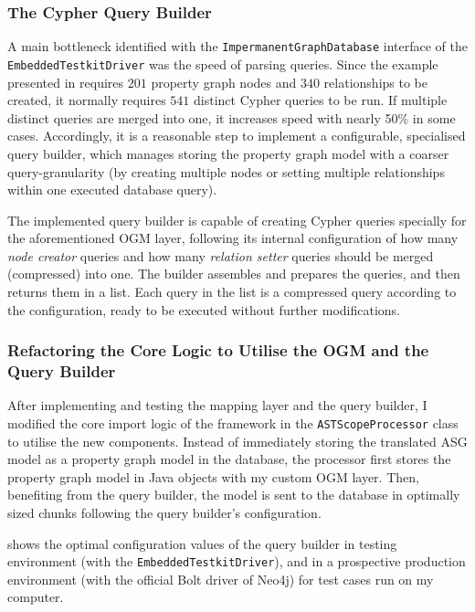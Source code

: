 \subsubsection{The Cypher Query Builder}

A main bottleneck identified with the \texttt{ImpermanentGraphDatabase} interface of the \texttt{EmbeddedTestkitDriver} was the speed of parsing queries. Since the example presented in  requires $201$ property graph nodes and $340$ relationships to be created, it normally requires $541$ distinct Cypher queries to be run. If multiple distinct queries are merged into one, it increases speed with nearly 50\% in some cases. Accordingly, it is a reasonable step to implement a configurable, specialised query builder, which manages storing the property graph model with a coarser query-granularity (by creating multiple nodes or setting multiple relationships within one executed database query).

The implemented query builder is capable of creating Cypher queries specially for the aforementioned OGM layer, following its internal configuration of how many \emph{node creator} queries and how many \emph{relation setter} queries should be merged (compressed) into one. The builder assembles and prepares the queries, and then returns them in a list. Each query in the list is a compressed query according to the configuration, ready to be executed without further modifications.


\subsubsection{Refactoring the Core Logic to Utilise the OGM and the Query Builder}

After implementing and testing the mapping layer and the query builder, I modified the core import logic of the framework in the \texttt{ASTScopeProcessor} class to utilise the new components. Instead of immediately storing the translated ASG model as a property graph model in the database, the processor first stores the property graph model in Java objects with my custom OGM layer. Then, benefiting from the query builder, the model is sent to the database in optimally sized chunks following the query builder's configuration.

 shows the optimal configuration values of the query builder in testing environment (with the \texttt{EmbeddedTestkitDriver}), and in a prospective production environment (with the official Bolt driver of Neo4j) for test cases run on my computer.

